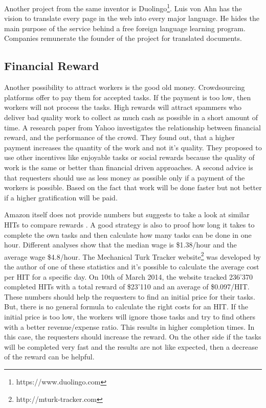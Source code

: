 Another project from the same inventor is Duolingo\footnote{https://www.duolingo.com}. Luis von Ahn has the vision to translate every page in the web into every major language. He hides the main purpose of the service behind a free foreign language learning program. Companies remunerate the founder of the project for translated documents.

\subsection{Financial Reward}
Another possibility to attract workers is the good old money. Crowdsourcing platforms offer to pay them for accepted tasks. If the payment is too low, then workers will not process the tasks. High rewards will attract spammers who deliver bad quality work to collect as much cash as possible in a short amount of time. A research paper from Yahoo \cite{mason} investigates the relationship between financial reward, and the performance of the crowd. They found out, that a higher payment increases the quantity of the work and not it's quality. They proposed to use other incentives like enjoyable tasks or social rewards because the quality of work is the same or better than financial driven approaches. A second advice is that requesters should use as less money as possible only if a payment of the workers is possible. Based on the fact that work will be done faster but not better if a higher gratification will be paid.

Amazon itself does not provide numbers but suggests to take a look at similar HITs to compare rewards \cite{mturk_bestpractices}. A good strategy is also to proof how long it takes to complete the own tasks and then calculate how many tasks can be done in one hour. Different analyses \cite{chilton,ipeirotis} show that the median wage is \$1.38/hour and the average wage \$4.8/hour. The Mechanical Turk Tracker website\footnote{http://mturk-tracker.com} was developed by the author of one of these statistics \cite{ipeirotis} and it's possible to calculate the average cost per HIT for a specific day. On 10th of March 2014, the website tracked 236'370 completed HITs with a total reward of \$23'110 and an average of \$0.097/HIT. These numbers should help the requesters to find an initial price for their tasks. But, there is no general formula to calculate the right costs for an HIT. If the initial price is too low, the workers will ignore those tasks and try to find others with a better revenue/expense ratio. This results in higher completion times. In this case, the requesters should increase the reward. On the other side if the tasks will be completed very fast and the results are not like expected, then a decrease of the reward can be helpful.

